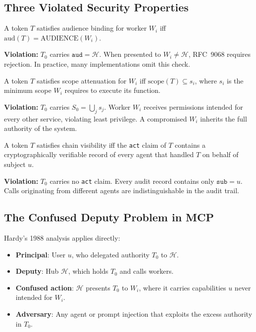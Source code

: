 \documentclass[journal]{IEEEtran}
\begin{document}
\subsection{Three Violated Security Properties}

\begin{definition}
A token $T$ satisfies audience binding for worker $W_i$ iff
$\mathrm{aud}(T) = \mathrm{AUDIENCE}(W_i)$.
\end{definition}

\textbf{Violation:} $T_0$ carries $\texttt{aud} = \mathcal{H}$. When presented
to $W_i \neq \mathcal{H}$, RFC~9068 requires rejection. In practice, many
implementations omit this check.

\begin{definition}
A token $T$ satisfies scope attenuation for $W_i$ iff
$\mathrm{scope}(T) \subseteq s_i$, where $s_i$ is the minimum scope $W_i$
requires to execute its function.
\end{definition}

\textbf{Violation:} $T_0$ carries $S_0 = \bigcup_j s_j$. Worker $W_i$ receives
permissions intended for every other service, violating least privilege. A
compromised $W_i$ inherits the full authority of the system.

\begin{definition}
A token $T$ satisfies chain visibility iff the \texttt{act} claim of $T$
contains a cryptographically verifiable record of every agent that handled $T$
on behalf of subject $u$.
\end{definition}

\textbf{Violation:} $T_0$ carries no \texttt{act} claim. Every audit record
contains only $\texttt{sub} = u$. Calls originating from different agents are
indistinguishable in the audit trail.

\subsection{The Confused Deputy Problem in MCP}

Hardy's 1988 analysis \cite{hardy1988} applies directly:

\begin{itemize}
  \item \textbf{Principal}: User $u$, who delegated authority $T_0$ to
        $\mathcal{H}$.
  \item \textbf{Deputy}: Hub $\mathcal{H}$, which holds $T_0$ and calls workers.
  \item \textbf{Confused action}: $\mathcal{H}$ presents $T_0$ to $W_i$, where
        it carries capabilities $u$ never intended for $W_i$.
  \item \textbf{Adversary}: Any agent or prompt injection that exploits the
        excess authority in $T_0$.
\end{itemize}
\end{document}
